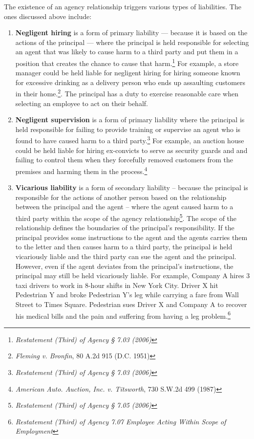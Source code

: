 \documentclass[11pt]{article}
\begin{document}
The existence of an agency relationship triggers various types of liabilities. The ones discussed above include:
\begin{enumerate}[wide, labelindent=0pt, itemsep=-1pt, topsep=1pt]
    \item[\textbullet] \textbf{Negligent hiring} is a form of primary liability --- because it is based on the actions of the principal --- where the principal is held responsible for selecting an agent that was likely to cause harm to a third party and put them in a position that creates the chance to cause that harm.\footnote{\textit{Restatement (Third) of Agency § 7.03 (2006)}}  For example, a store manager could be held liable for negligent hiring for hiring someone known for excessive drinking as a delivery person who ends up assaulting customers in their home.\footnote{ \textit{Fleming v. Bronfin}, 80 A.2d 915 (D.C. 1951)}. The principal has a duty to exercise reasonable care when selecting an employee to act on their behalf.
    \item[\textbullet] \textbf{Negligent supervision} is a form of primary liability where the principal is held responsible for failing to provide training or supervise an agent who is found to have caused harm to a third party.\footnote{\textit{Restatement (Third) of Agency § 7.03 (2006)}}  For example, an auction house could be held liable for hiring ex-convicts to serve as security guards and and failing to control them when they forcefully removed customers from the premises and harming them in the process.\footnote{\textit{American Auto. Auction, Inc. v. Titsworth}, 730 S.W.2d 499 (1987)}    
    \item[\textbullet] \textbf{Vicarious liability} is a form of secondary liability -- because the principal is responsible for the actions of another person based on the relationship between the principal and the agent -- where the agent caused harm to a third party within the scope of the agency relationship\footnote{\textit{Restatement (Third) of Agency § 7.05 (2006)}}. The scope of the relationship defines the boundaries of the principal's responsibility.  If the principal provides some instructions to the agent and the agents carries them to the letter and then causes harm to a third party, the principal is held vicariously liable and the third party can sue the agent and the principal.  However, even if the agent deviates from the principal's instructions, the principal may still be held vicariously liable.  For example, Company A hires 3 taxi drivers to work in 8-hour shifts in New York City.  Driver X hit Pedestrian Y and broke Pedestrian Y's leg while carrying a fare from Wall Street to Times Square.  Pedestrian sues Driver X and Company A to recover his medical bills and the pain and suffering from having a leg problem.\footnote{\textit{Restatement (Third) of Agency 7.07 Employee Acting Within Scope of Employment}}
\end{enumerate}
\end{document}
